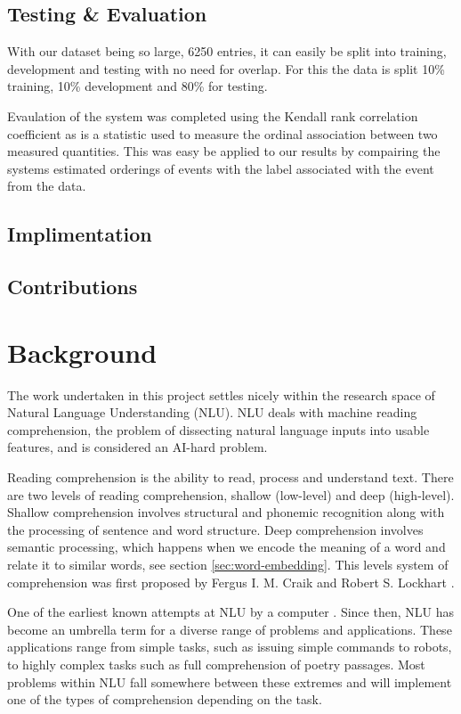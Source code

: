 \documentclass[bsc,frontabs,twoside,singlespacing,parskip,deptreport]{infthesis}     %
\begin{document}
\section{Testing \& Evaluation}
With our dataset being so large, 6250 entries, it can
easily be split into training, development and testing with no
need for overlap. For this the data is split 10\% training,
10\% development and 80\% for testing.

Evaulation of the system was completed using the
Kendall rank correlation coefficient as is a statistic
used to measure the ordinal association between two
measured quantities. This was easy be applied to our results
by compairing the systems estimated orderings of events
with the label associated with the event from the data.

\section{Implimentation}
\section{Contributions}

\chapter{Background}
The work undertaken in this project settles nicely within the research space of Natural Language Understanding (NLU).
NLU deals with machine reading comprehension, the problem of dissecting natural language inputs into usable features,
and is considered an AI-hard problem.

Reading comprehension is the ability to read, process and understand text.  
There are two levels of reading comprehension, shallow (low-level) and deep (high-level).
Shallow comprehension involves structural and phonemic recognition along with the processing of sentence and  word
structure.
Deep comprehension involves semantic processing, which happens when we encode the meaning of a word and relate it
to similar words, see section \ref{sec:word-embedding}.
This levels system of comprehension was first proposed by  Fergus I. M. Craik and Robert S. Lockhart \cite{wagner2009beyond}.

One of the earliest known attempts at NLU by a computer \cite{russell1995modern}. Since then, NLU has become an
umbrella term for a diverse range of problems and applications. These applications range from simple tasks, such as
issuing simple commands to robots, to highly complex tasks such as full comprehension of poetry passages.
Most problems within NLU fall somewhere between these extremes and will implement one of the types of comprehension
depending on the task.
\end{document}
